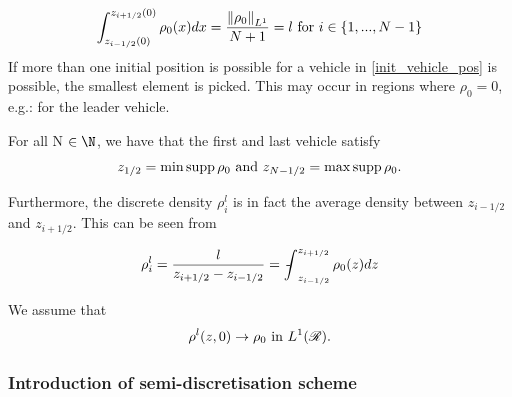 \begin{equation} \label{init_vehicle_pos}
	\int_{z_{i-1/2}(0)}^{z_{i+1/2}(0)} \rho_0(x) dx = \frac{\left\lVert\rho_0\right\rVert_{L^1}}{N+1} = l \text{ for } i \in \{1,...,N-1\}
\end{equation}
If more than one initial position is possible for a vehicle in \eqref{init_vehicle_pos} is possible, the smallest element is picked. This may occur in regions where $\rho_0 = 0$, e.g.: for the leader vehicle.  
\begin{remark}
	For all N $\in \N$, we have that the first and last vehicle satisfy
	\begin{equation} \label{rem:pos_first_last_vehicle}
		z_{1/2} = \min \operatorname{supp} \rho_0 \text{ and } z_{N-1/2} = \max \operatorname{supp} \rho_0.
	\end{equation}
\end{remark}
Furthermore, the discrete density $\rho_i^l$ is in fact the average density between $z_{i-1/2}$ and $z_{i+1/2}$. This can be seen from 

\begin{equation} \label{average_int}
	\rho^l_i = \frac{l}{z_{i+1/2} - z_{i-1/2}} = \avint_{z_{i-1/2}}^{z_{i+1/2}} \rho_0(z)dz 
\end{equation}

We assume that 
\begin{equation}
	\rho^l(z,0) \rightarrow \rho_0 \text{ in } L^1(\mathscr{R}).
\end{equation}

 
\subsubsection{Introduction of semi-discretisation scheme}

